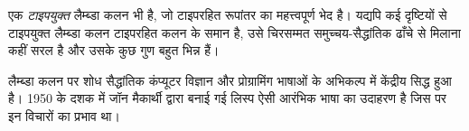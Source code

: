\documentclass[../../../include/open-logic-section]{subfiles}
\begin{document}
\begin{digress}
एक \emph{टाइपयुक्त} लैम्ब्डा कलन भी है, जो टाइपरहित रूपांतर का महत्त्वपूर्ण
भेद है। यद्यपि कई दृष्टियों से टाइपयुक्त लैम्ब्डा कलन टाइपरहित कलन के समान
है, उसे चिरसम्मत समुच्चय-सैद्धांतिक ढाँचे से मिलाना कहीं सरल है और उसके कुछ
गुण बहुत भिन्न हैं।

लैम्ब्डा कलन पर शोध सैद्धांतिक कंप्यूटर विज्ञान और प्रोग्रामिंग भाषाओं के
अभिकल्प में केंद्रीय सिद्ध हुआ है। 1950 के दशक में जॉन मैकार्थी द्वारा
बनाई गई लिस्प ऐसी आरंभिक भाषा का उदाहरण है जिस पर इन विचारों का प्रभाव था।
\end{digress}
\end{document}

